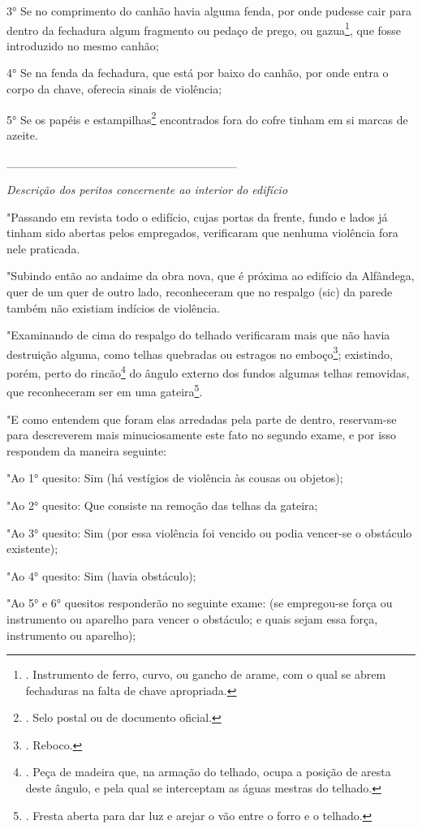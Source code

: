 3° Se no comprimento do canhão havia alguma fenda, por onde pudesse cair
para dentro da fechadura algum fragmento ou pedaço de prego, ou
gazua\footnote{. Instrumento de ferro, curvo, ou gancho de arame, com o
  qual se abrem fechaduras na falta de chave apropriada.}, que fosse
introduzido no mesmo canhão;

4° Se na fenda da fechadura, que está por baixo do canhão, por onde
entra o corpo da chave, oferecia sinais de violência;

5° Se os papéis e estampilhas\footnote{. Selo postal ou de documento
  oficial.} encontrados fora do cofre tinham em si marcas de azeite.

\_\_\_\_\_\_\_\_\_\_\_\_\_\_\_\_\_\_\_\_\_\_\_\_\_\_\_

\emph{Descrição dos peritos concernente ao interior do edifício}

"Passando em revista todo o edifício, cujas portas da frente, fundo e
lados já tinham sido abertas pelos empregados, verificaram que nenhuma
violência fora nele praticada.

"Subindo então ao andaime da obra nova, que é próxima ao edifício da
Alfândega, quer de um quer de outro lado, reconheceram que no respalgo
(sic) da parede também não existiam indícios de violência.

"Examinando de cima do respalgo do telhado verificaram mais que não
havia destruição alguma, como telhas quebradas ou estragos no
emboço\footnote{. Reboco.}; existindo, porém, perto do rincão\footnote{.
  Peça de madeira que, na armação do telhado, ocupa a posição de aresta
  deste ângulo, e pela qual se interceptam as águas mestras do telhado.}
do ângulo externo dos fundos algumas telhas removidas, que reconheceram
ser em uma gateira\footnote{. Fresta aberta para dar luz e arejar o vão
  entre o forro e o telhado.}.

"E como entendem que foram elas arredadas pela parte de dentro,
reservam-se para descreverem mais minuciosamente este fato no segundo
exame, e por isso respondem da maneira seguinte:

"Ao 1° quesito: Sim (há vestígios de violência às cousas ou objetos);

"Ao 2° quesito: Que consiste na remoção das telhas da gateira;

"Ao 3° quesito: Sim (por essa violência foi vencido ou podia vencer-se o
obstáculo existente);

"Ao 4° quesito: Sim (havia obstáculo);

"Ao 5° e 6° quesitos responderão no seguinte exame: (se empregou-se
força ou instrumento ou aparelho para vencer o obstáculo; e quais sejam
essa força, instrumento ou aparelho);

